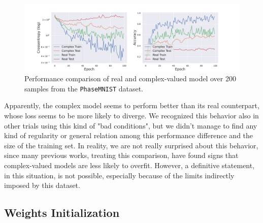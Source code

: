 \documentclass[../main.tex]{subfiles}
\begin{document}
\begin{figure}[!ht]
	\centering
	\includegraphics[width=\textwidth]{pictures/phasemnist_200}
	\caption{Performance comparison of real and complex-valued model over 200 samples from the \texttt{PhaseMNIST} dataset.}
	\label{fig:phasemnist_200}
\end{figure}
Apparently, the complex model seems to perform better than its real counterpart, whose loss seems to be more likely to diverge. We recognized this behavior also in other trials using this kind of "bad conditions", but we didn't manage to find any kind of regularity or general relation among this performance difference and the size of the training set. In reality, we are not really surprised about this behavior, since many previous works, treating this comparison, have found signs that complex-valued models are less likely to overfit. However, a definitive statement, in this situation, is not possible, especially because of the limits indirectly imposed by this dataset.


\subsection*{Weights Initialization}
\end{document}
